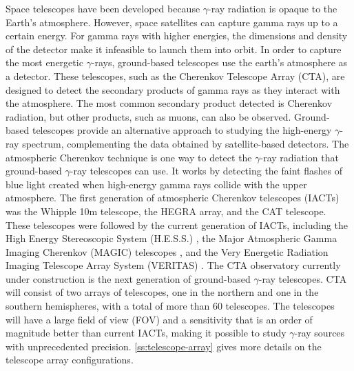 Space telescopes have been developed because $\gamma$-ray radiation is opaque to the Earth's atmosphere. However, space satellites can capture gamma rays up to a certain energy. For gamma rays with higher energies, the dimensions and density of the detector make it infeasible to launch them into orbit. In order to capture the most energetic $\gamma$-rays, ground-based telescopes use the earth's atmosphere as a detector. These telescopes, such as the Cherenkov Telescope Array (CTA), are designed to detect the secondary products of gamma rays as they interact with the atmosphere. The most common secondary product detected is Cherenkov radiation, but other products, such as muons, can also be observed. Ground-based telescopes provide an alternative approach to studying the high-energy $\gamma$-ray spectrum, complementing the data obtained by satellite-based detectors. The atmospheric Cherenkov technique is one way to detect the $\gamma$-ray radiation that ground-based $\gamma$-ray telescopes can use. It works by detecting the faint flashes of blue light created when high-energy gamma rays collide with the upper atmosphere. The first generation of atmospheric Cherenkov telescopes (IACTs) was the Whipple 10m telescope, the HEGRA array, and the CAT telescope. These telescopes were followed by the current generation of IACTs, including the High Energy Stereoscopic System (H.E.S.S.) \cite{hess_2000}, the Major Atmospheric Gamma Imaging Cherenkov (MAGIC) telescopes \cite{magic_1999}, and the Very Energetic Radiation Imaging Telescope Array System (VERITAS) \cite{weekes2002very}. The CTA observatory currently under construction is the next generation of ground-based $\gamma$-ray telescopes. CTA will consist of two arrays of telescopes, one in the northern and one in the southern hemispheres, with a total of more than 60 telescopes. The telescopes will have a large field of view (FOV) and a sensitivity that is an order of magnitude better than current IACTs, making it possible to study $\gamma$-ray sources with unprecedented precision. \autoref{ss:telescope-array} gives more details on the telescope array configurations.

